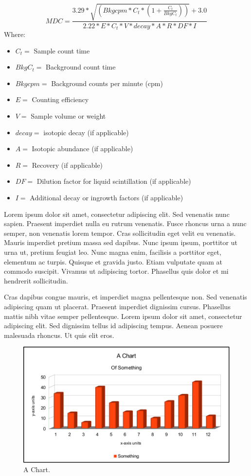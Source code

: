 \documentclass[double,12pt]{beavtex}
\begin{document}
\begin{equation}
MDC=\frac{3.29*\sqrt{(Bkgcpm*C_{t}*(1+\frac{C_{t}}{BkgC_{t}}))}+3.0}{2.22*E*C_{t}*V*decay*A*R*DF*I}
\label{eq:mdc}
\end{equation}
Where:

\begin{itemize}
\item $C_{t} =$ Sample count time
\item $BkgC_{t} =$ Background count time
\item $Bkgcpm =$ Background counts per minute (cpm)
\item $E =$ Counting efficiency
\item $V =$ Sample volume or weight
\item $decay =$ isotopic decay (if applicable)
\item $A =$ Isotopic abundance (if applicable)
\item $R =$ Recovery (if applicable)
\item $DF =$ Dilution factor for liquid scintillation (if applicable)
\item $I =$ Additional decay or ingrowth factors (if applicable)
\end{itemize}

Lorem ipsum dolor sit amet, consectetur adipiscing elit. Sed venenatis nunc sapien. Praesent imperdiet nulla eu rutrum venenatis. Fusce rhoncus urna a nunc semper, non venenatis lorem tempor. Cras sollicitudin eget velit eu venenatis. Mauris imperdiet pretium massa sed dapibus. Nunc ipsum ipsum, porttitor ut urna ut, pretium feugiat leo. Nunc magna enim, facilisis a porttitor eget, elementum ac turpis. Quisque et gravida justo. Etiam vulputate quam at commodo suscipit. Vivamus ut adipiscing tortor. Phasellus quis dolor et mi hendrerit sollicitudin. 

Cras dapibus congue mauris, et imperdiet magna pellentesque non. Sed venenatis adipiscing quam ut placerat. Praesent imperdiet dignissim cursus. Phasellus mattis nibh vitae semper pellentesque. Lorem ipsum dolor sit amet, consectetur adipiscing elit. Sed dignissim tellus id adipiscing tempus. Aenean posuere malesuada rhoncus. Ut quis elit eros.


\pagebreak[4]

\begin{figure}
\begin{center}
	\includegraphics[width=14cm]{chart.pdf}
	\caption{A Chart.}
	\label{fig:chart}
	\end{center}
\end{figure}
\end{document}
